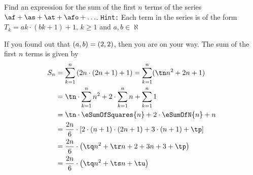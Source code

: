 



\gcalcexpr[0]
\gcalcexpr[0]
\gcalcexpr[0]
\gcalcexpr[0]

\gcalcexpr[0]\tn{\vbone * \vbtwo}
\gcalcexpr[0]
\gcalcexpr[0]
\gcalcexpr[0] 
\gcalcexpr[0]
\gcalcexpr[0]

\question[3] Find an expression for the sum of the first $n$ terms of the series 
$\af + \as + \at + \afo + \ldots$. \texttt{Hint:} Each term in the series is of the 
form $T_k = ak\cdot(bk + 1) + 1,\, k \geq 1$ and $a,b \in\aleph$

\watchout

\ifprintanswers
\fi 

\begin{solution}[\halfpage]
  If you found out that $(a,b) = (2, 2)$, then you are on your way. The sum of the 
  first $n$ terms is given by
	\begin{align}
		S_n &= \sum_{k=1}^{n}\left(\vbone n\cdot(\vbtwo n+1)+1\right) = \sum_{k=1}^{n}(\tn n^2+\vbone n + 1) \\
		&= \tn\cdot\sum_{k=1}^{n}n^2 + \vbone\cdot\sum_{k=1}^{n}n + \sum_{k=1}^{n}1 \\
		&= \tn\cdot\eSumOfSquares{n} + \vbone\cdot\eSumOfN{n} + n \\
		&= \dfrac{\vbone n}{6}\cdot\left[ \vbtwo\cdot(n+1)\cdot(2n+1) + 3\cdot(n+1) + \tp \right] \\
		&= \dfrac{\vbone n}{6}\cdot\left( \tq n^2 + \tr n + \vbtwo + 3n + 3 + \tp \right) \\
		&= \dfrac{\vbone n}{6}\cdot\left( \tq n^2 + \ts n + \tu \right)
	\end{align}
\end{solution}
